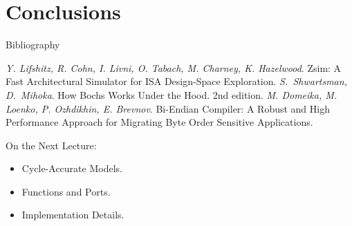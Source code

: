 \section*{Conclusions}

\begin{frame}[allowframebreaks]{Bibliography}
\begin{thebibliography}{99}
\bibitem{} \textit{Y. Lifshitz, R. Cohn, I. Livni, O. Tabach, M. Charney, K.
  Hazelwood}. Zsim: A Fast Architectural Simulator for ISA Design-Space
  Exploration.
\bibitem{} \textit{S.~Shwartsman, D.~Mihoka}. How Bochs Works Under the Hood.
  2nd edition.
\bibitem{} \textit{M. Domeika, M. Loenko, P. Ozhdikhin, E. Brevnov}. Bi-Endian
  Compiler: A Robust and High Performance Approach for Migrating Byte Order
  Sensitive Applications.
\end{thebibliography}
\end{frame}

\begin{frame}{On the Next Lecture:}
\begin{itemize}
\item Cycle-Accurate Models.
\item Functions and Ports.
\item Implementation Details.
\end{itemize}
\end{frame}

\finalslide


